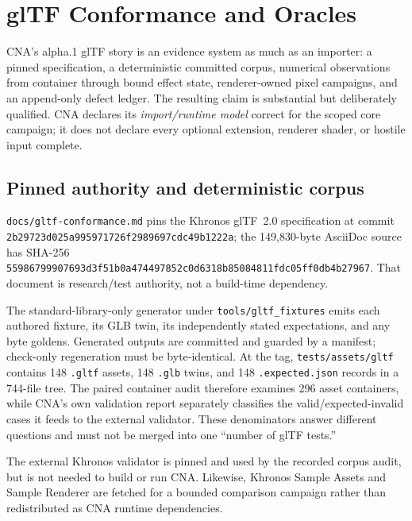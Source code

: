 \chapter{glTF Conformance and Oracles}
\label{ch:gltf-conformance}

CNA's alpha.1 glTF story is an evidence system as much as an importer: a pinned specification,
a deterministic committed corpus, numerical observations from container through bound effect
state, renderer-owned pixel campaigns, and an append-only defect ledger. The resulting claim is
substantial but deliberately qualified. CNA declares its \emph{import/runtime model} correct for
the scoped core campaign; it does not declare every optional extension, renderer shader, or
hostile input complete.

\section{Pinned authority and deterministic corpus}

\texttt{docs/gltf-conformance.md} pins the Khronos glTF~2.0 specification at commit
\texttt{2b29723d025a9959\allowbreak 71726f2989697cdc\allowbreak 49b1222a}; the 149,830-byte AsciiDoc source has SHA-256
\texttt{55986799907693d3\allowbreak f51b0a474497852c\allowbreak 0d6318b85084811f\allowbreak dc05ff0db4b27967}.
That document is research/test authority, not a build-time dependency.

The standard-library-only generator under \texttt{tools/gltf\_fixtures} emits each authored
fixture, its GLB twin, its independently stated expectations, and any byte goldens. Generated
outputs are committed and guarded by a manifest; check-only regeneration must be byte-identical.
At the tag, \texttt{tests/assets/gltf} contains 148 \texttt{.gltf} assets, 148 \texttt{.glb}
twins, and 148 \texttt{.expected.json} records in a 744-file tree. The paired container audit
therefore examines 296 asset containers, while CNA's own validation report separately classifies
the valid/expected-invalid cases it feeds to the external validator. These denominators answer
different questions and must not be merged into one ``number of glTF tests.''

The external Khronos validator is pinned and used by the recorded corpus audit, but is not needed
to build or run CNA. Likewise, Khronos Sample Assets and Sample Renderer are fetched for a bounded
comparison campaign rather than redistributed as CNA runtime dependencies.

